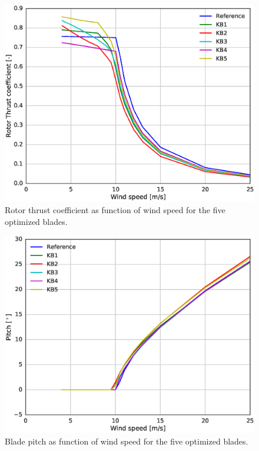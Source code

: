 \begin{figure}[pht]
\begin{center}
	\includegraphics[width=.85\linewidth]{figures/KBcomp_CT.eps}
\end{center}
\caption{Rotor thrust coefficient as function of wind speed for the five optimized blades.}
\label{fig:ct}
\end{figure}

\begin{figure}[pht]
\begin{center}
	\includegraphics[width=.85\linewidth]{figures/KBcomp_pitch.eps}
\end{center}
\caption{Blade pitch as function of wind speed for the five optimized blades.}
\label{fig:pitch}
\end{figure}

